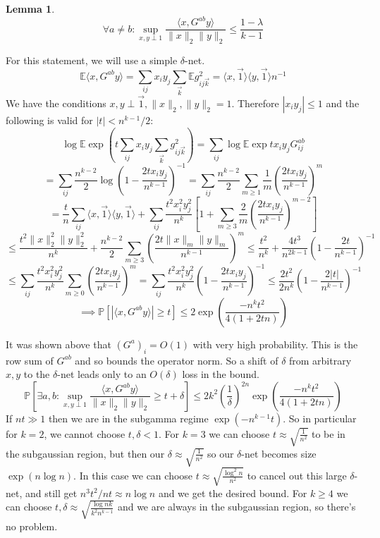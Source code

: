 \documentclass{article}
\newtheorem{lemma}[theorem]{Lemma}
\newcommand{\E}{\mathbb{E}}
\renewcommand{\Pr}{\mathbb{P}}
\begin{document}
\begin{lemma}
\[ \forall a \neq b: \sup_{x,y \perp 1} \dfrac{\langle x, G^{ab} y \rangle}{\|x\|_{2} \|y\|_{2}} \leq \frac{1 - \lambda}{k-1} \]
\end{lemma}
For this statement, we will use a simple $\delta$-net. 
\[ \E \langle x, G^{ab} y \rangle = \sum_{ij} x_{i} y_{j} \sum_{\vec{k}} \E g_{ij\vec{k}}^{2} = \langle x, \vec{1} \rangle \langle y, \vec{1} \rangle n^{-1}  \]
We have the conditions $x,y \perp \vec{1}, \|x\|_{2}, \|y\|_{2} = 1$. Therefore $|x_{i} y_{j}| \leq 1$ and the following is valid for $|t| < n^{k-1}/2$:
\[ \log \E \exp \left( t \sum_{ij} x_{i} y_{j} \sum_{\vec{k}} g_{ij\vec{k}}^{2}  \right) = \sum_{ij} \log \E \exp t x_{i} y_{j} G^{ab}_{ij} \]
\[ = \sum_{ij} \frac{n^{k-2}}{2} \log \left(1 - \frac{2t x_{i} y_{j}}{n^{k-1}}  \right)^{-1} = \sum_{ij} \frac{n^{k-2}}{2} \sum_{m \geq 1} \frac{1}{m} \left( \frac{2 t x_{i} y_{j}}{n^{k-1}} \right)^{m}  \]
\[ = \frac{t}{n} \sum_{ij} \langle x, \vec{1} \rangle \langle y, \vec{1} \rangle  + \sum_{ij} \frac{t^{2} x_{i}^{2} y_{j}^{2}}{n^{k}} \left[1 + \sum_{m \geq 3} \frac{2}{m} \left( \frac{2 t x_{i} y_{j}}{n^{k-1}} \right)^{m-2} \right]  \]
\[ \leq \frac{t^{2} \|x\|_{2}^{2} \|y\|_{2}^{2}}{n^{k}} + \frac{n^{k-2}}{2} \sum_{m \geq 3} \left( \frac{2 t \|x\|_{m} \|y\|_{m}}{n^{k-1}}  \right)^{m} \leq \frac{t^{2}}{n^{k}} + \frac{4 t^{3}}{n^{2k-1}} \left(1 - \frac{2 t}{n^{k-1}} \right)^{-1}   \]
\[ \leq \sum_{ij} \frac{t^{2} x_{i}^{2} y_{j}^{2}}{n^{k}} \sum_{m \geq 0} \left( \frac{2 t x_{i} y_{j}}{n^{k-1}} \right)^{m} = \sum_{ij} \frac{t^{2} x_{i}^{2} y_{j}^{2}}{n^{k}} \left( 1 - \frac{2 t x_{i} y_{j}}{n^{k-1}} \right)^{-1} \leq \frac{2t^{2}}{2n^{k}} \left(1 - \frac{2 |t|}{n^{k-1}} \right)^{-1}  \]
\[ \implies \Pr [ |\langle x, G^{ab} y \rangle| \geq t ] \leq 2 \exp \left( \frac{-n^{k} t^{2}}{4(1 + 2tn)}  \right)  \]

It was shown above that $(G^{a})_{i} = O(1)$ with very high probability. This is the row sum of $G^{ab}$ and so bounds the operator norm. So a shift of $\delta$ from arbitrary $x,y$ to the $\delta$-net leads only to an $O(\delta)$ loss in the bound. 
\[ \Pr [ \exists a,b:  \sup_{x,y \perp 1} \frac{\langle x, G^{ab} y \rangle}{\|x\|_{2} \|y\|_{2}} \geq t + \delta ] \leq 2 k^{2} \left( \frac{1}{\delta} \right)^{2n} \exp \left( \frac{- n^{k} t^{2}}{4(1 + 2tn)} \right)    \]
If $nt \gg 1$ then we are in the subgamma regime $\exp(-n^{k-1} t)$. So in particular for $k=2$, we cannot choose $t, \delta < 1$. For $k=3$ we can choose $t \approx \sqrt{\frac{1}{n^{2}}}$ to be in the subgaussian region, but then our $\delta \approx \sqrt{\frac{1}{n^{2}}}$ so our $\delta$-net becomes size $\exp(n \log n)$. In this case we can choose $t \approx \sqrt{\frac{\log^{2} n}{n^{2}}}$ to cancel out this large $\delta$-net, and still get $n^{3} t^{2} / nt \approx n \log n$ and we get the desired bound. For $k \geq 4$ we can choose $t,\delta \approx \sqrt{ \frac{\log nk}{k^{2} n^{k-1}}}$ and we are always in the subgaussian region, so there's no problem. 
\end{document}
